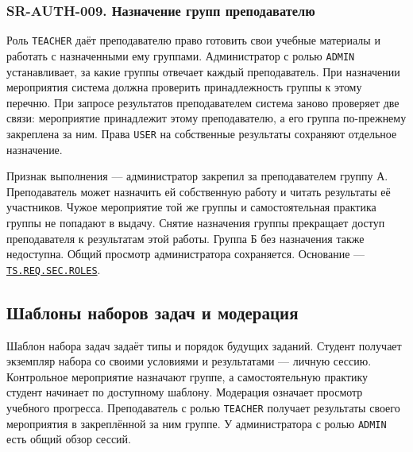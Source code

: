 \documentclass[12pt,a4paper]{article}
\begin{document}
\subsubsection{SR-AUTH-009. Назначение групп преподавателю}\label{sr-auth-009-ux43dux430ux437ux43dux430ux447ux435ux43dux438ux435-ux433ux440ux443ux43fux43f-ux43fux440ux435ux43fux43eux434ux430ux432ux430ux442ux435ux43bux44e}

\hypertarget{sr-auth-009-назначение-групп-преподавателю}{}

\hypertarget{sr-auth-009}{}

Роль \texttt{TEACHER} даёт преподавателю право готовить свои учебные материалы и работать с назначенными ему группами. Администратор с ролью \texttt{ADMIN} устанавливает, за какие группы отвечает каждый преподаватель. При назначении мероприятия система должна проверить принадлежность группы к этому перечню. При запросе результатов преподавателем система заново проверяет две связи: мероприятие принадлежит этому преподавателю, а его группа по-прежнему закреплена за ним. Права \texttt{USER} на собственные результаты сохраняют отдельное назначение.

Признак выполнения --- администратор закрепил за преподавателем группу А. Преподаватель может назначить ей собственную работу и читать результаты её участников. Чужое мероприятие той же группы и самостоятельная практика группы не попадают в выдачу. Снятие назначения группы прекращает доступ преподавателя к результатам этой работы. Группа Б без назначения также недоступна. Общий просмотр администратора сохраняется. Основание --- {\href{../02\_Техническое\_задание/DOC-02\_Техническое\_задание.pdf\#ts-req-sec-roles}{\texttt{TS.\allowbreak{}REQ.\allowbreak{}SEC.\allowbreak{}ROLES}}}.

\subsection{Шаблоны наборов задач и модерация}\label{ux448ux430ux431ux43bux43eux43dux44b-ux43dux430ux431ux43eux440ux43eux432-ux437ux430ux434ux430ux447-ux438-ux43cux43eux434ux435ux440ux430ux446ux438ux44f}

\hypertarget{шаблоны-наборов-задач-и-модерация}{}

Шаблон набора задач задаёт типы и порядок будущих заданий. Студент получает экземпляр набора со своими условиями и результатами --- личную сессию. Контрольное мероприятие назначают группе, а самостоятельную практику студент начинает по доступному шаблону. Модерация означает просмотр учебного прогресса. Преподаватель с ролью \texttt{TEACHER} получает результаты своего мероприятия в закреплённой за ним группе. У администратора с ролью \texttt{ADMIN} есть общий обзор сессий.
\end{document}

